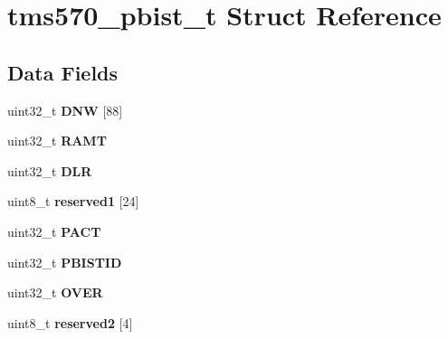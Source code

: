 \hypertarget{structtms570__pbist__t}{}\section{tms570\+\_\+pbist\+\_\+t Struct Reference}
\label{structtms570__pbist__t}
\subsection*{Data Fields}
\begin{DoxyCompactItemize}
\item 
\mbox{\label{structtms570__pbist__t_a0d08bf685393ef06b5de48541cf844ce}} 
uint32\+\_\+t {\bfseries D\+NW} \mbox{[}88\mbox{]}
\item 
\mbox{\label{structtms570__pbist__t_a343f0b4968b5f690ef7dedc203eb8c58}} 
uint32\+\_\+t {\bfseries R\+A\+MT}
\item 
\mbox{\label{structtms570__pbist__t_acc37267a26e86e2b16858cd273793ddf}} 
uint32\+\_\+t {\bfseries D\+LR}
\item 
\mbox{\label{structtms570__pbist__t_a6648dd7d07314d4efddf6973fae4e9fc}} 
uint8\+\_\+t {\bfseries reserved1} \mbox{[}24\mbox{]}
\item 
\mbox{\label{structtms570__pbist__t_a3518681cd242baa19c3027cc8d50ef29}} 
uint32\+\_\+t {\bfseries P\+A\+CT}
\item 
\mbox{\label{structtms570__pbist__t_aca148875ed1e2904a81d49ed4541dd96}} 
uint32\+\_\+t {\bfseries P\+B\+I\+S\+T\+ID}
\item 
\mbox{\label{structtms570__pbist__t_adf07323506f997280a1391409d1f96ce}} 
uint32\+\_\+t {\bfseries O\+V\+ER}
\item 
\mbox{\label{structtms570__pbist__t_ab0ef0cbd21dfae172f50321004dc8b8e}} 
uint8\+\_\+t {\bfseries reserved2} \mbox{[}4\mbox{]}
\item 
\mbox{\label{structtms570__pbist__t_abd6569e5de524e364ca45096885e61e9}} 

\end{DoxyCompactItemize}
